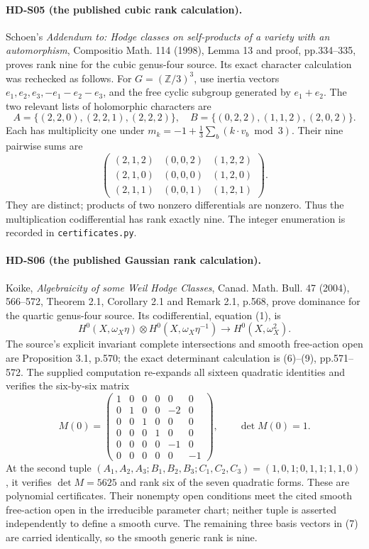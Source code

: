 \paragraph{HD-S05 (the published cubic rank calculation).}
Schoen's \emph{Addendum to: Hodge classes on self-products of a variety
with an automorphism}, Compositio Math. 114 (1998), Lemma 13 and proof,
pp.334--335, proves rank nine for the cubic genus-four source.
Its exact character calculation was rechecked as follows.
For \(G=(\mathbb Z/3)^3\), use inertia vectors
\(e_1,e_2,e_3,-e_1-e_2-e_3\), and the free cyclic subgroup generated
by \(e_1+e_2\).
The two relevant lists of holomorphic characters are
\[
 A=\{(2,2,0),(2,2,1),(2,2,2)\},\quad
 B=\{(0,2,2),(1,1,2),(2,0,2)\}.
\]
Each has multiplicity one under
\(m_k=-1+\frac13\sum_b(k\cdot v_b\bmod3)\).
Their nine pairwise sums are
\[
\begin{pmatrix}
(2,1,2)&(0,0,2)&(1,2,2)\\
(2,1,0)&(0,0,0)&(1,2,0)\\
(2,1,1)&(0,0,1)&(1,2,1)
\end{pmatrix}.
\]
They are distinct; products of two nonzero differentials are nonzero.
Thus the multiplication codifferential has rank exactly nine.
The integer enumeration is recorded in \texttt{certificates.py}.

\paragraph{HD-S06 (the published Gaussian rank calculation).}
Koike, \emph{Algebraicity of some Weil Hodge Classes},
Canad. Math. Bull. 47 (2004), 566--572,
Theorem 2.1, Corollary 2.1 and Remark 2.1, p.568,
prove dominance for the quartic genus-four source.
Its codifferential, equation (1), is
\[
H^0(X,\omega_X\eta)\otimes H^0(X,\omega_X\eta^{-1})
\longrightarrow H^0(X,\omega_X^2).
\]
The source's explicit invariant complete intersections and smooth free-action
open are Proposition 3.1, p.570; the exact determinant calculation is
(6)--(9), pp.571--572.
The supplied computation re-expands all sixteen quadratic identities
and verifies the six-by-six matrix
\[
M(0)=
\begin{pmatrix}
1&0&0&0&0&0\\
0&1&0&0&-2&0\\
0&0&1&0&0&0\\
0&0&0&1&0&0\\
0&0&0&0&-1&0\\
0&0&0&0&0&-1
\end{pmatrix},\qquad\det M(0)=1.
\]
At the second tuple
\((A_1,A_2,A_3;B_1,B_2,B_3;C_1,C_2,C_3)
=(1,0,1;0,1,1;1,1,0)\), it verifies \(\det M=5625\)
and rank six of the seven quadratic forms.
These are polynomial certificates. Their nonempty open conditions meet
the cited smooth free-action open in the irreducible parameter chart;
neither tuple is asserted independently to define a smooth curve.
The remaining three basis vectors in (7) are carried identically,
so the smooth generic rank is nine.

